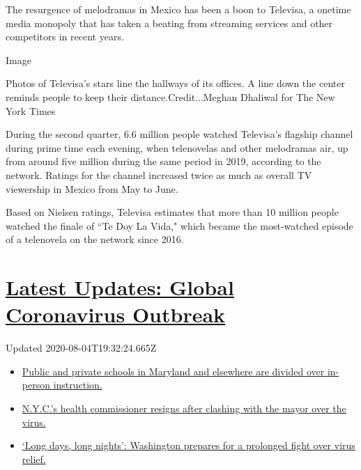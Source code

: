 The resurgence of melodramas in Mexico has been a boon to Televisa, a
onetime media monopoly that has taken a beating from streaming services
and other competitors in recent years.

Image

Photos of Televisa's stars line the hallways of its offices. A line down
the center reminds people to keep their distance.Credit...Meghan
Dhaliwal for The New York Times

During the second quarter, 6.6 million people watched Televisa's
flagship channel during prime time each evening, when telenovelas and
other melodramas air, up from around five million during the same period
in 2019, according to the network. Ratings for the channel increased
twice as much as overall TV viewership in Mexico from May to June.

Based on Nielsen ratings, Televisa estimates that more than 10 million
people watched the finale of ``Te Doy La Vida," which became the
most-watched episode of a telenovela on the network since 2016.

\hypertarget{latest-updates-global-coronavirus-outbreak}{%
\section{\texorpdfstring{\href{https://www.nytimes.com/2020/08/04/world/coronavirus-cases.html?action=click\&pgtype=Article\&state=default\&region=MAIN_CONTENT_1\&context=storylines_live_updates}{Latest
Updates: Global Coronavirus
Outbreak}}{Latest Updates: Global Coronavirus Outbreak}}\label{latest-updates-global-coronavirus-outbreak}}

Updated 2020-08-04T19:32:24.665Z

\begin{itemize}
\tightlist
\item
  \href{https://www.nytimes.com/2020/08/04/world/coronavirus-cases.html?action=click\&pgtype=Article\&state=default\&region=MAIN_CONTENT_1\&context=storylines_live_updates\#link-4825b93}{Public
  and private schools in Maryland and elsewhere are divided over
  in-person instruction.}
\item
  \href{https://www.nytimes.com/2020/08/04/world/coronavirus-cases.html?action=click\&pgtype=Article\&state=default\&region=MAIN_CONTENT_1\&context=storylines_live_updates\#link-4d1eafa8}{N.Y.C.'s
  health commissioner resigns after clashing with the mayor over the
  virus.}
\item
  \href{https://www.nytimes.com/2020/08/04/world/coronavirus-cases.html?action=click\&pgtype=Article\&state=default\&region=MAIN_CONTENT_1\&context=storylines_live_updates\#link-6b644638}{`Long
  days, long nights': Washington prepares for a prolonged fight over
  virus relief.}
\end{itemize}

